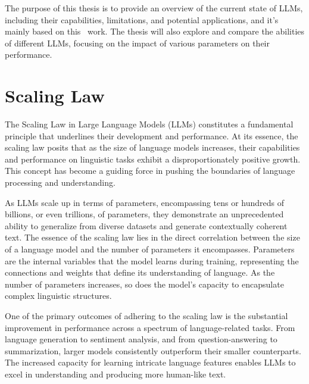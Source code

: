 The purpose of this thesis is to provide an overview of the current state of LLMs, including their capabilities, limitations, and potential applications, and it's mainly based on this~\cite{survey} work.
The thesis will also explore and compare the abilities of different LLMs, focusing on the impact of various parameters on their performance.


\section{Scaling Law}
\label{sec:scaling-law-in-large-language-models}

The Scaling Law in Large Language Models (LLMs) constitutes a fundamental principle that underlines their development and performance.
At its essence, the scaling law posits that as the size of language models increases, their capabilities and performance on linguistic tasks exhibit a disproportionately positive growth.
This concept has become a guiding force in pushing the boundaries of language processing and understanding.

As LLMs scale up in terms of parameters, encompassing tens or hundreds of billions, or even trillions, of parameters, they demonstrate an unprecedented ability to generalize from diverse datasets and generate contextually coherent text.
The essence of the scaling law lies in the direct correlation between the size of a language model and the number of parameters it encompasses.
Parameters are the internal variables that the model learns during training, representing the connections and weights that define its understanding of language.
As the number of parameters increases, so does the model's capacity to encapsulate complex linguistic structures.

One of the primary outcomes of adhering to the scaling law is the substantial improvement in performance across a spectrum of language-related tasks.
From language generation to sentiment analysis, and from question-answering to summarization, larger models consistently outperform their smaller counterparts.
The increased capacity for learning intricate language features enables LLMs to excel in understanding and producing more human-like text.

